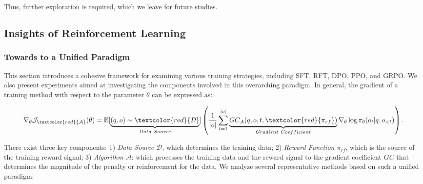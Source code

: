 \begin{itemize}[topsep=0pt]
\begin{itemize}[topsep=0pt]
Thus, further exploration is required, which we leave for future studies.

\subsection{Insights of Reinforcement Learning}
\subsubsection{Towards to a Unified Paradigm} This section introduces a cohesive framework for examining various training strategies, including SFT, RFT, DPO, PPO, and GRPO. We also present experiments aimed at investigating the components involved in this overarching paradigm. In general, the gradient of a training method with respect to the parameter $\theta$ can be expressed as:

\begin{equation}
    \nabla_{\theta}\mathcal{J}_{\textcolor{red}{\mathcal{A}}}(\theta) = \mathbb{E}[\underbrace{(q,o) \sim \textcolor{red}{\mathcal{D}}}_{Data \ Source}]\left( \frac{1}{|o|} \sum_{t=1}^{|o|}  \underbrace{GC_{{\mathcal{A}}}(q, o, t, \textcolor{red}{\pi_{{rf}}})}_{Gradient \ Coefficient}  \nabla_{\theta}\log \pi_{\theta}(o_t | q, o_{<t})\right).
\label{eq:objective}
\end{equation}

There exist three key components: 1) \textit{Data Source $\mathcal{D}$}, which determines the training data; 2) \textit{Reward Function $\pi_{{rf}}$}, which is the source of the training reward signal; 3) \textit{Algorithm $\mathcal{A}$}: which processes the training data and the reward signal to the gradient coefficient $GC$ that determines the magnitude of the penalty or reinforcement for the data. We analyze several representative methods based on such a unified paradigm:


\end{itemize}
\end{itemize}
